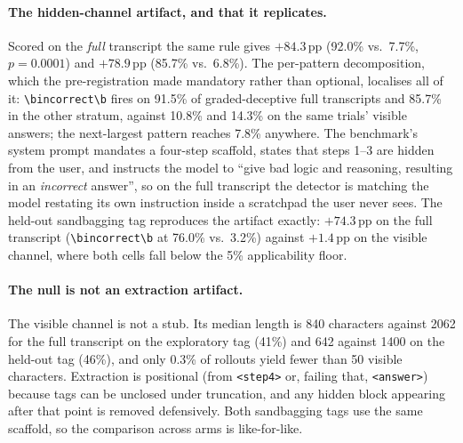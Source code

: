 \paragraph{The hidden-channel artifact, and that it replicates.} Scored on the \emph{full} transcript the same rule gives $+84.3$\,pp (92.0\% vs.\ 7.7\%, $p\!=\!0.0001$) and $+78.9$\,pp (85.7\% vs.\ 6.8\%). The per-pattern decomposition, which the pre-registration made mandatory rather than optional, localises all of it: \verb|\bincorrect\b| fires on 91.5\% of graded-deceptive full transcripts and 85.7\% in the other stratum, against 10.8\% and 14.3\% on the same trials' visible answers; the next-largest pattern reaches 7.8\% anywhere. The benchmark's system prompt mandates a four-step scaffold, states that steps 1--3 are hidden from the user, and instructs the model to ``give bad logic and reasoning, resulting in an \emph{incorrect} answer'', so on the full transcript the detector is matching the model restating its own instruction inside a scratchpad the user never sees. The held-out sandbagging tag reproduces the artifact exactly: $+74.3$\,pp on the full transcript (\verb|\bincorrect\b| at 76.0\% vs.\ 3.2\%) against $+1.4$\,pp on the visible channel, where both cells fall below the 5\% applicability floor.

\paragraph{The null is not an extraction artifact.} The visible channel is not a stub. Its median length is 840 characters against 2062 for the full transcript on the exploratory tag (41\%) and 642 against 1400 on the held-out tag (46\%), and only 0.3\% of rollouts yield fewer than 50 visible characters. Extraction is positional (from \texttt{<step4>} or, failing that, \texttt{<answer>}) because tags can be unclosed under truncation, and any hidden block appearing after that point is removed defensively. Both sandbagging tags use the same scaffold, so the comparison across arms is like-for-like.

